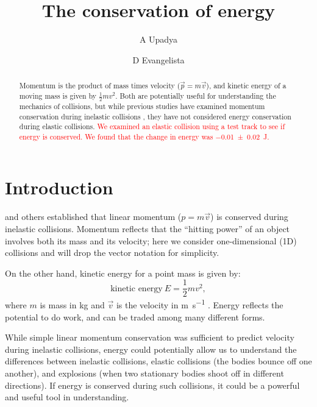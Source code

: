 \documentclass[aps,prl,preprint]{revtex4-1}
\begin{document}
\linenumbers
\title{The conservation of energy}
\author{A Upadya}
\author{D Evangelista}

\newcommand{\student}[1]{{\textcolor{red}{#1}}}

\begin{abstract}
Momentum is the product of mass times velocity ($\vec{p}=m\vec{v}$), and kinetic energy of a moving mass is given by $\frac{1}{2}mv^2$. Both are potentially useful for understanding the mechanics of collisions, but while previous studies have examined momentum conservation during inelastic collisions \cite{ortega-2021-momentum}, they have not considered energy conservation during elastic collisions. \student{We examined an elastic collision using
a test track to see if energy is conserved. We found that the change in energy was
\qty{-0.01\pm0.02}{\joule}.}
\end{abstract}
\maketitle

\section{Introduction}
\cite{ortega-2021-momentum} and others established that linear momentum ($p=m\vec{v}$) is conserved during inelastic collisions. Momentum reflects that the ``hitting power'' of an object involves both its mass and its velocity; here we consider one-dimensional (1D) collisions and will drop the vector notation for simplicity.  

On the other hand, kinetic energy for a point mass is given by:
\begin{equation}
\text{kinetic energy}\ E = \frac{1}{2} m v^2,
\label{eq:energy}
\end{equation}
where $m$ is mass in \si{\kilo\gram} and $\vec{v}$ is the velocity in \si{\meter\per\second} \cite{duchatelet-1741-reponse, coriolis-1829-calcul}. Energy reflects the potential to do work, and can be traded among many different forms. 

While simple linear momentum conservation was sufficient to predict velocity during inelastic collisions, energy could potentially allow us to understand the differences between  inelastic collisions, elastic collisions (the bodies bounce off one another), and explosions (when two stationary bodies shoot off in different directions). If energy is conserved during such collisions, it could be a powerful and useful tool in understanding.
\end{document}
